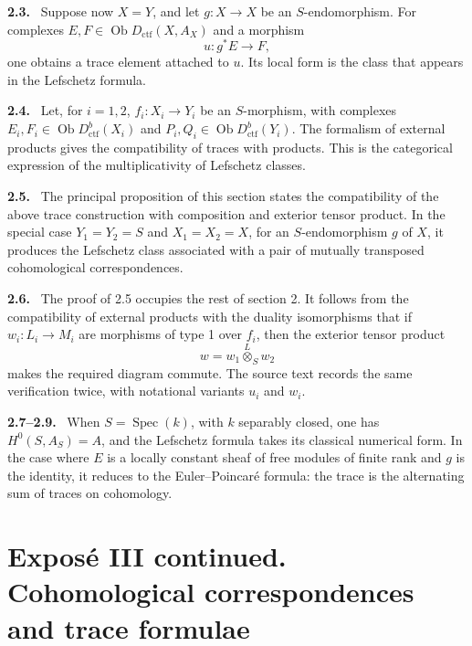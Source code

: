 \documentclass[12pt]{article}
\newcommand{\Spec}{\operatorname{Spec}}
\newcommand{\ob}{\operatorname{Ob}}
\newenvironment{statement}[1]{\par\medskip\noindent\textbf{#1.}\ }{\par\medskip}
\begin{document}
\begin{statement}{2.3}
Suppose now $X=Y$, and let $g:X\to X$ be an $S$-endomorphism. For complexes $E,F\in\ob D_{\mathrm{ctf}}(X,A_X)$ and a morphism
\[
   u:g^*E\longrightarrow F,
\]
one obtains a trace element attached to $u$. Its local form is the class that appears in the Lefschetz formula.
\end{statement}

\begin{statement}{2.4}
Let, for $i=1,2$, $f_i:X_i\to Y_i$ be an $S$-morphism, with complexes $E_i,F_i\in\ob D^b_{\mathrm{ctf}}(X_i)$ and $P_i,Q_i\in\ob D^b_{\mathrm{ctf}}(Y_i)$. The formalism of external products gives the compatibility of traces with products. This is the categorical expression of the multiplicativity of Lefschetz classes.
\end{statement}

\begin{statement}{2.5}
The principal proposition of this section states the compatibility of the above trace construction with composition and exterior tensor product. In the special case $Y_1=Y_2=S$ and $X_1=X_2=X$, for an $S$-endomorphism $g$ of $X$, it produces the Lefschetz class associated with a pair of mutually transposed cohomological correspondences.
\end{statement}

\begin{statement}{2.6}
The proof of 2.5 occupies the rest of section 2. It follows from the compatibility of external products with the duality isomorphisms that if $w_i:L_i\to M_i$ are morphisms of type 1 over $f_i$, then the exterior tensor product
\[
   w=w_1\overset L\otimes_S w_2
\]
makes the required diagram commute. The source text records the same verification twice, with notational variants $u_i$ and $w_i$.
\end{statement}

\begin{statement}{2.7--2.9}
When $S=\Spec(k)$, with $k$ separably closed, one has $H^0(S,A_S)=A$, and the Lefschetz formula takes its classical numerical form. In the case where $E$ is a locally constant sheaf of free modules of finite rank and $g$ is the identity, it reduces to the Euler--Poincaré formula: the trace is the alternating sum of traces on cohomology.
\end{statement}


\section*{Exposé III continued. Cohomological correspondences and trace formulae}
\end{document}
